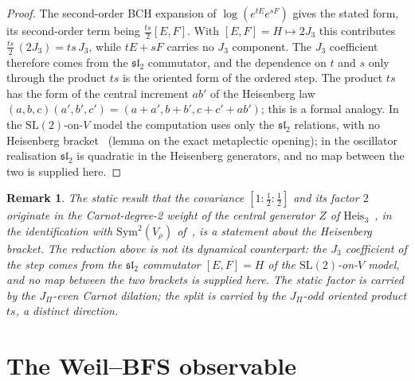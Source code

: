\documentclass[11pt]{article}
\providecommand{\Sym}{\mathrm{Sym}}
\providecommand{\Heis}{\mathrm{Heis}}
\newtheorem{remark}{Remark}
\begin{document}
    \begin{proof}
      The second-order BCH expansion of $\log(e^{tE}e^{sF})$ gives the stated form, its second-order
      term being $\tfrac{ts}{2}[E,F]$.
      With $[E,F] = H \mapsto 2J_3$ this contributes $\tfrac{ts}{2}\,(2J_3) = ts\,J_3$, while $tE + sF$ carries no
      $J_3$ component.
      The $J_3$ coefficient therefore comes from the $\mathfrak{sl}_2$ commutator, and the dependence on $t$ and $s$
      only through the product $ts$ is the oriented form of the ordered step.
      The product $ts$ has the form of the central increment $ab'$ of the Heisenberg law
      $(a,b,c)(a',b',c') = (a+a', b+b', c+c'+ab')$; this is a formal analogy.
      In the $\mathrm{SL}(2)$-on-$V$ model the computation uses only the $\mathfrak{sl}_2$ relations, with no
      Heisenberg bracket~\cite{Beau2026prs} (lemma on the exact metaplectic opening); in the oscillator realisation
      $\mathfrak{sl}_2$ is quadratic in the Heisenberg generators, and no map between the two is supplied here.
    \end{proof}

    \begin{remark}
      The static result that the covariance $[1:\tfrac12:\tfrac12]$ and its factor $2$ originate in the
      Carnot-degree-2 weight of the central generator $Z$ of $\Heis_3$~\cite{Beau2026a34}, in the identification
      with $\Sym^2(V_\rho)$ of~\cite{Beau2026a33}, is a statement about the Heisenberg bracket.
      The reduction above is not its dynamical counterpart: the $J_3$ coefficient of the step comes from the
      $\mathfrak{sl}_2$ commutator $[E,F]=H$ of the $\mathrm{SL}(2)$-on-$V$ model, and no map between the two
      brackets is supplied here.
      The static factor is carried by the $J_\Pi$-even Carnot dilation; the split is carried by the
      $J_\Pi$-odd oriented product $ts$, a distinct direction.
    \end{remark}

  \section{The Weil--BFS observable}
\end{document}
